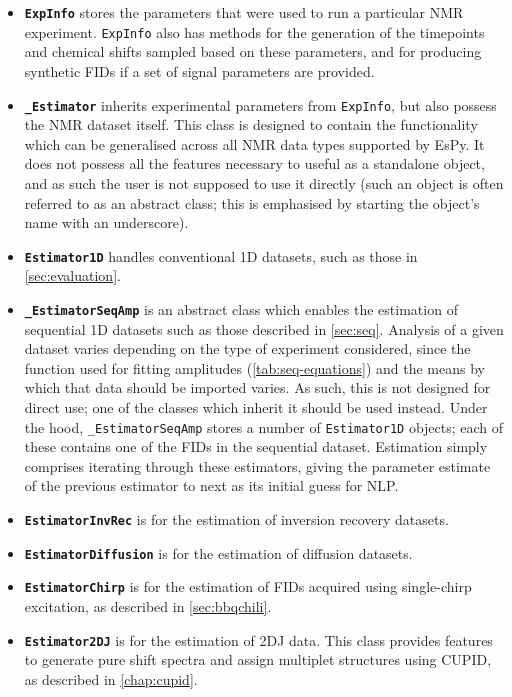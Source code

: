 \begin{itemize}
    \item \textbf{\textbf{\texttt{ExpInfo}}} stores the parameters that were
        used to run a particular \ac{NMR} experiment. \texttt{ExpInfo} also has
        methods for the generation of the timepoints and chemical shifts sampled
        based on these parameters, and for producing synthetic \acp{FID} if a
        set of signal parameters are provided.
    \item \textbf{\texttt{\_Estimator}} inherits experimental parameters from
        \texttt{ExpInfo}, but also possess the \ac{NMR} dataset itself.
        This class is designed to contain the functionality which can be
        generalised across all \ac{NMR} data types supported by \ac{EsPy}. It
        does not possess all the features necessary to useful as a standalone
        object, and as such the user is not supposed to use it directly (such
        an object is often referred to as an abstract class; this is emphasised
        by starting the object's name with an underscore).
    \item \textbf{\texttt{Estimator1D}} handles conventional \ac{1D} datasets,
        such as those in \cref{sec:evaluation}.
    \item \textbf{\texttt{\_EstimatorSeqAmp}} is an abstract class
        which enables the estimation of sequential \ac{1D} datasets such as those
        described in \cref{sec:seq}. Analysis of a given dataset varies depending on
        the type of experiment considered, since the function used for
        fitting amplitudes (\cref{tab:seq-equations}) and the means by
        which that data should be imported varies. As such, this is not
        designed for direct use; one of the classes which inherit it should be
        used instead. Under the hood, \texttt{\_EstimatorSeqAmp} stores a
        number of \texttt{Estimator1D} objects; each of these contains one
        of the \acp{FID} in the sequential dataset. Estimation simply comprises
        iterating through these estimators, giving the parameter estimate of
        the previous estimator to next as its initial guess for \ac{NLP}.
    \item \textbf{\texttt{EstimatorInvRec}} is for the estimation of inversion
        recovery datasets.
    \item \textbf{\texttt{EstimatorDiffusion}} is for the estimation of
        diffusion datasets.
    \item \textbf{\texttt{EstimatorChirp}} is for the estimation of \acp{FID}
        acquired using single-chirp excitation, as described in \cref{sec:bbqchili}.
    \item \textbf{\texttt{Estimator2DJ}} is for the estimation of \ac{2DJ} data.
        This class provides features to generate pure shift spectra and
        assign multiplet structures using \ac{CUPID}, as described in
        \cref{chap:cupid}.
\end{itemize}

